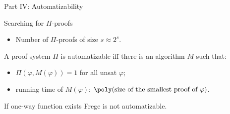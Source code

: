 \begin{frame}

    \begin{center}
        \Huge Part IV: Automatizability
    \end{center}
    
\end{frame}

\begin{frame}{Searching for $\Pi$-proofs}

    \begin{itemize}
        \item Number of $\Pi$-proofs of size $s \approx 2^s$.  
    \end{itemize}
    \begin{definition}
        A proof system $\Pi$ is automatizable iff there is an algorithm $M$ such that:
        \begin{itemize}
            \item $\Pi(\varphi, M(\varphi)) = 1$ for all unsat $\varphi$;
            \item running time of $M(\varphi)$: $\poly(\text{size of the smallest proof of $\varphi$})$.
        \end{itemize}
    \end{definition}
\end{frame}

\begin{theorem}
    If one-way function exists Frege is not automatizable.
\end{theorem}